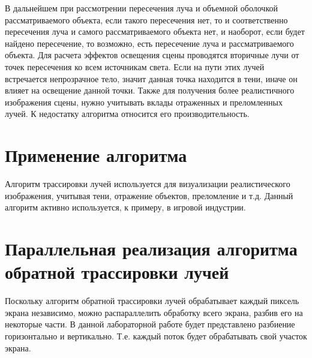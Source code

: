 \begin{figure}[ht!]
\end{figure}

В дальнейшем при рассмотрении пересечения луча и объемной оболочкой
рассматриваемого объекта, если такого пересечения нет, то и соответственно пере­сечения
луча и самого рассматриваемого объекта нет, и наоборот, если будет найдено
пересечение, то возможно, есть пересечение луча и рассматриваемого объекта. Для
расчета эффектов освещения сцены проводятся вторичные лучи от точек пересече­ния
ко всем источникам света. Если на пути этих лучей встречается непрозрачное
тело, значит данная точка находится в тени, иначе он влияет на освещение данной
точки. Также для получения более реалистичного изображения сцены, нужно учи­тывать
вклады отраженных и преломленных лучей.
К недостатку алгоритма относится его производительность.

\section{Применение алгоритма}

Алгоритм трассировки лучей используется для визуализации
реалистического изображения, учитывая тени, отражение объектов, преломление и т.д.
Данный алгоритм активно используется, к примеру, в игровой индустрии.

\section{Параллельная реализация алгоритма обратной трассировки лучей}

Поскольку алгоритм обратной трассировки лучей обрабатывает каждый пиксель
экрана независимо, можно распараллелить обработку всего экрана, разбив
его на некоторые части. В данной лабораторной работе будет представлено 
разбиение горизонтально и вертикально. Т.е. каждый поток будет обрабатывать
свой участок экрана. 

